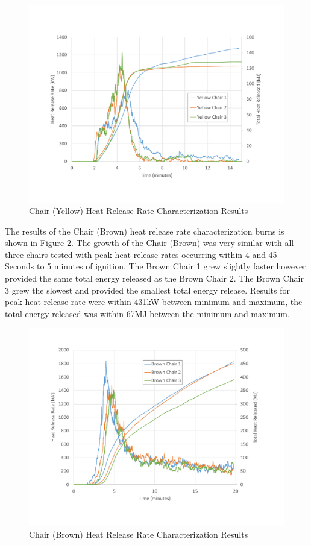 \documentclass{article}
\begin{document}
\begin{figure}[H]
	\centering
	\includegraphics[width=\textwidth]{0_Images/Furniture/ChairYellow_HRR.pdf}
	\caption{Chair (Yellow) Heat Release Rate Characterization Results}
	\label{fig:YellowChairHRR}
\end{figure}

The results of the Chair (Brown) heat release rate characterization burns is shown in Figure \ref{fig:BrownChairHRR}. The growth of the Chair (Brown) was very similar with all three chairs tested with peak heat release rates occurring within 4 and 45 Seconds to 5 minutes of ignition. The Brown Chair 1 grew slightly faster however provided the same total energy released as the Brown Chair 2. The Brown Chair 3 grew the slowest and provided the smallest total energy release. Results for peak heat release rate were within 431kW between minimum and maximum, the total energy released was within 67MJ between the minimum and maximum. 

\begin{figure}[H]
	\centering
	\includegraphics[height=0.45\textheight]{0_Images/Furniture/BrownChair_HRR.pdf}
	\caption{Chair (Brown) Heat Release Rate Characterization Results}
	\label{fig:BrownChairHRR}
\end{figure}
\end{document}
